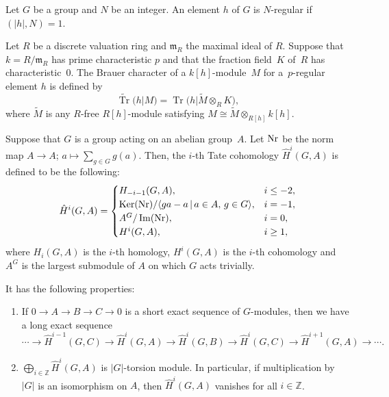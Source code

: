 \begin{Definition}
Let $G$ be a group and $N$ be an integer. An element $h$ of $G$ is $N$-regular if $(|h|,N)=1$.
\end{Definition}

\begin{Definition}
Let $R$ be a discrete valuation ring and $\mathfrak{m}_R$ the maximal ideal of $R$. Suppose that $k=R/\mathfrak{m}_R$ has prime characteristic $p$ and that the fraction field~$K$ of~$R$ has characteristic~$0$. The Brauer character of a $k[h]$-module~$M$ for a~$p$-regular element $h$ is defined by
\[
\widetilde{\operatorname{Tr}}(h|M)=\operatorname{Tr}\big(h|\widetilde{M}\otimes_RK\big),
\]
 where $\widetilde{M}$ is any $R$-free $R[h]$-module satisfying $M\cong\widetilde{M}\otimes_{R[h]}k[h]$.
\end{Definition}

\begin{Definition}[{\cite[Chapter IV]{CF}}]\label{Tate}
Suppose that $G$ is a group acting on an abelian group~$A$. Let ${\rm Nr}$ be the norm map $A\rightarrow A$; $a\mapsto\sum_{g\in G}{g(a)}$. Then, the $i$-th Tate cohomology ${\hat{H}}^i(G,A)$ is defined to be the following:
 \[
{\hat{H}}^i(G,A)= \begin{cases}
H_{-i-1}(G,A), & i\leq-2, \\
\operatorname{Ker}({\rm Nr})/\langle ga-a\,|\,a \in A, \, g\in G\rangle, & i=-1, \\
A^G/\operatorname{Im}({\rm Nr}), & i=0, \\
H^i(G,A), & i \geq1,
 \end{cases}
 \]
where $H_i(G,A)$ is the $i$-th homology, $H^i(G,A)$ is the $i$-th cohomology and $A^G$ is the largest submodule of $A$ on which $G$ acts trivially.
\end{Definition}

It has the following properties:
\begin{enumerate}\itemsep=0pt
\item[(1)] If $0\rightarrow A \rightarrow B \rightarrow C \rightarrow 0$ is a short exact sequence of $G$-modules, then we have a long exact sequence
\[
\cdots \rightarrow {\hat{H}}^{i-1}(G,C)\rightarrow {\hat{H}}^{i}(G,A)\rightarrow {\hat{H}}^{i}(G,B)\rightarrow {\hat{H}}^{i}(G,C)\rightarrow {\hat{H}}^{i+1}(G,A) \rightarrow \cdots.
\]
\item[(2)] $\bigoplus_{i\in \mathbb{Z}}{\hat{H}}^i(G,A)$ is $ |G |$-torsion module. In particular, if multiplication by $|G|$ is an isomorphism on $A$, then $\hat{H}^i(G,A)$ vanishes for all $i\in \mathbb{Z}$.
\end{enumerate}

